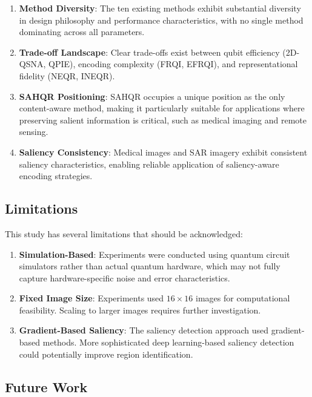 \documentclass{ipol}
\begin{document}
\begin{enumerate}
\item \textbf{Method Diversity}: The ten existing methods exhibit substantial diversity in design philosophy and performance characteristics, with no single method dominating across all parameters.

\item \textbf{Trade-off Landscape}: Clear trade-offs exist between qubit efficiency (2D-QSNA, QPIE), encoding complexity (FRQI, EFRQI), and representational fidelity (NEQR, INEQR).

\item \textbf{SAHQR Positioning}: SAHQR occupies a unique position as the only content-aware method, making it particularly suitable for applications where preserving salient information is critical, such as medical imaging and remote sensing.

\item \textbf{Saliency Consistency}: Medical images and SAR imagery exhibit consistent saliency characteristics, enabling reliable application of saliency-aware encoding strategies.
\end{enumerate}

\subsection{Limitations}

This study has several limitations that should be acknowledged:

\begin{enumerate}
\item \textbf{Simulation-Based}: Experiments were conducted using quantum circuit simulators rather than actual quantum hardware, which may not fully capture hardware-specific noise and error characteristics.

\item \textbf{Fixed Image Size}: Experiments used $16 \times 16$ images for computational feasibility. Scaling to larger images requires further investigation.

\item \textbf{Gradient-Based Saliency}: The saliency detection approach used gradient-based methods. More sophisticated deep learning-based saliency detection could potentially improve region identification.
\end{enumerate}

\subsection{Future Work}
\end{document}
